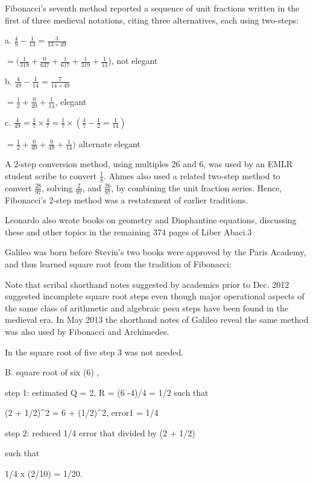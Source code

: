 \documentclass[12pt]{article}
\begin{document}
Fibonacci's seventh method reported a sequence of unit fractions written in the first of three medieval notations, citing three alternatives, each using two-steps:

a. $\frac{4}{9} - \frac{1}{13} = \frac{3}{13 \times 49}$

$ = (\frac{1}{319} + \frac{0}{637} + \frac{1}{617} + \frac{1}{319} + \frac{1}{13}$), not elegant

b. $\frac{4}{49} - \frac{1}{14} = \frac{7}{14 \times 49}$

$ = \frac{1}{2} + \frac{0}{49} + \frac{1}{14}$, elegant

c. $\frac{4}{49} = \frac{1}{7} \times \frac{4}{7} = \frac{1}{7} \times (\frac{4}{7} - \frac{1}{2} = \frac{1}{14})$

$ = \frac{1}{2} + \frac{0}{49} + \frac{0}{49} + \frac{1}{14})$ alternate elegant

A 2-step conversion method, using multiples 26 and 6, was used by an EMLR student scribe to convert $\frac{1}{8}$. Ahmes also used a related two-step method to convert $\frac{28}{97}$, solving $\frac{2}{97}$, and $\frac{26}{97}$, by combining the unit fraction series. Hence, Fibonacci's 2-step method was a restatement of earlier traditions.

Leonardo also wrote books on geometry and Diophantine equations, discussing these and other topics in the remaining 374 pages of Liber Abaci.3

Galileo was born before Stevin's two books were approved by the Paris Academy, and thus learned square root from the tradition of Fibonacci: 

Note that scribal shorthand notes suggested by academics prior to Dec. 2012 suggested incomplete square root steps even though major operational aspects of the same class of arithmetic and algebraic pesu steps have been found in the medieval era. In May 2013 the shorthand notes of Galileo reveal the same method was also used by Fibonacci and Archimedes.

In the square root of five step 3 was not needed.

B. square root of six (6) ,

step 1: estimated Q = 2, R = (6 -4)/4 = 1/2 such that

(2 + 1/2)^2 = 6 + (1/2)^2, error1 = 1/4

step 2: reduced 1/4 error that divided by (2 + 1/2)

such that

1/4 x (2/10) = 1/20.
\end{document}
